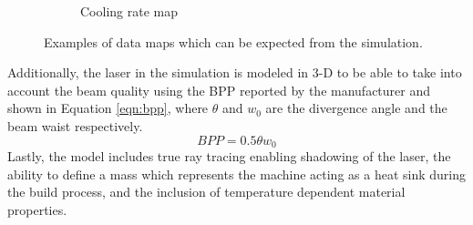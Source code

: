\documentclass[pdflatex,sn-mathphys]{sn-jnl}
\begin{document}
\begin{figure}[!htb]
\begin{subfigure}[c]{0.3\textwidth}
				\caption{Cooling rate map}
				\label{fig:COOLRATE}
				\end{subfigure}
		\caption{Examples of data maps which can be expected from the simulation.}
		\label{fig:data_maps}	
	\end{figure}
	Additionally, the laser in the simulation is modeled in 3-D to be able to take into account the beam quality using the \ac{BPP} reported by the manufacturer and shown in Equation \ref{eqn:bpp}, where $\theta$ and $w_0$ are the divergence angle and the beam waist respectively.
	\begin{equation}\label{eqn:bpp}
		BPP = 0.5 \theta w_0
	\end{equation} 
	Lastly, the model includes true ray tracing enabling shadowing of the laser, the ability to define a mass which represents the machine acting as a heat sink during the build process, and the inclusion of temperature dependent material properties.
	
\end{document}
